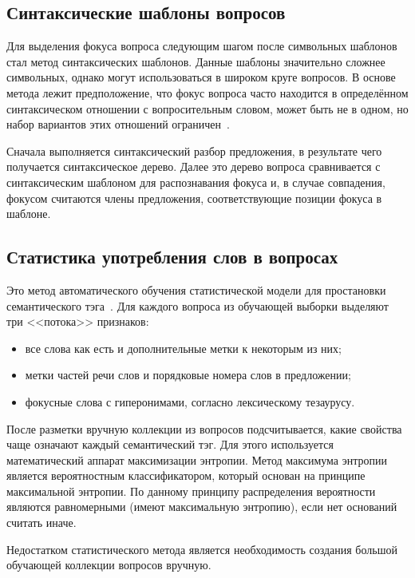 \subsection{Синтаксические шаблоны вопросов}
Для выделения фокуса вопроса следующим шагом после символьных шаблонов стал метод синтаксических шаблонов. Данные шаблоны значительно сложнее символьных, однако могут использоваться в широком круге вопросов. В основе метода лежит предположение, что фокус вопроса часто находится в определённом синтаксическом отношении с вопросительным словом,
может быть не в одном, но набор вариантов этих отношений ограничен~\cite{step1}. 

Сначала выполняется синтаксический разбор предложения, в результате чего получается синтаксическое дерево. Далее это дерево вопроса сравнивается с синтаксическим шаблоном для распознавания фокуса и, в случае совпадения, фокусом считаются члены предложения, соответствующие позиции фокуса в шаблоне.

\subsection{Статистика употребления слов в вопросах}

Это метод автоматического обучения статистической модели для простановки семантического
тэга~\cite{step1}. Для каждого вопроса из обучающей выборки выделяют три <<потока>> признаков:

\begin{itemize}[label=---]
	\item все слова как есть и дополнительные метки к некоторым из них;
	\item метки частей речи слов и порядковые номера слов в предложении;
	\item фокусные слова с гиперонимами, согласно лексическому тезаурусу.
\end{itemize}

После разметки вручную коллекции из вопросов подсчитывается, какие свойства чаще означают каждый семантический тэг. Для этого используется математический аппарат максимизации энтропии. Метод максимума энтропии~\cite{maxentr} является вероятностным классификатором, который основан на принципе максимальной энтропии. По данному принципу распределения вероятности являются равномерными (имеют максимальную энтропию), если нет оснований считать иначе.

Недостатком статистического метода является необходимость создания большой обучающей коллекции вопросов вручную.


